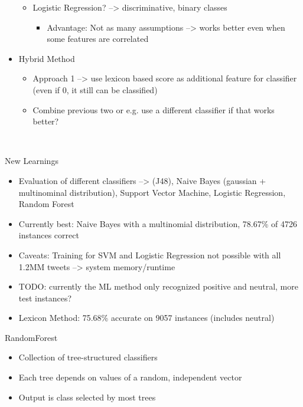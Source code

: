 \begin{itemize}
\begin{itemize}
\begin{itemize}
           
        \end{itemize}
        \item Logistic Regression? --> discriminative, binary classes
        \begin{itemize}
        \item Advantage: Not as many assumptions --> works better even when some features are correlated
        \end{itemize} 
        
    \end{itemize}
    \item Hybrid Method
    \begin{itemize}
        \item Approach 1 --> use lexicon based score as additional feature for classifier (even if 0, it still can be classified)
        \item Combine previous two or e.g. use a different classifier if that works better?
    \end{itemize}
\end{itemize}
\

New Learnings
\begin{itemize}
    \item Evaluation of different classifiers --> (J48), Naive Bayes (gaussian + multinominal distribution), Support Vector Machine, Logistic Regression, Random Forest
    \item Currently best: Naive Bayes with a multinomial distribution, 78.67\% of 4726 instances correct
    \item Caveats: Training for SVM and Logistic Regression not possible with all 1.2MM tweets --> system memory/runtime
    \item TODO: currently the ML method only recognized positive and neutral, more test instances?
    \item Lexicon Method: 75.68\% accurate on 9057 instances (includes neutral)
\end{itemize}

RandomForest
\begin{itemize}
    \item Collection of tree-structured classifiers
    \item Each tree depends on values of a random, independent vector
    \item Output is class selected by most trees
\end{itemize}

